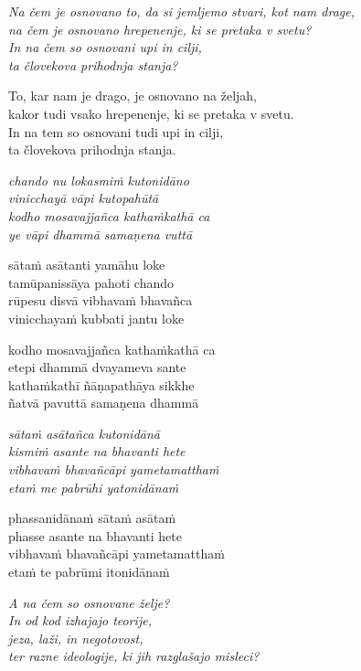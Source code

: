 \emph{Na čem je osnovano to, da si jemljemo stvari, kot nam drage,}\\
\emph{na čem je osnovano hrepenenje, ki se pretaka v svetu?}\\
\emph{In na čem so osnovani upi in cilji,}\\
\emph{ta človekova prihodnja stanja?}

To, kar nam je drago, je osnovano na željah,\\
kakor tudi vsako hrepenenje, ki se pretaka v svetu.\\
In na tem so osnovani tudi upi in cilji,\\
ta človekova prihodnja stanja.


\clearpage

\emph{chando nu lokasmiṁ kutonidāno\\
vinicchayā vāpi kutopahūtā}\\
\emph{kodho mosavajjañca kathaṁkathā ca\\
ye vāpi dhammā samaṇena vuttā}

sātaṁ asātanti yamāhu loke\\
tamūpanissāya pahoti chando\\
rūpesu disvā vibhavaṁ bhavañca\\
vinicchayaṁ kubbati jantu loke

kodho mosavajjañca kathaṁkathā ca\\
etepi dhammā dvayameva sante\\
kathaṁkathī ñāṇapathāya sikkhe\\
ñatvā pavuttā samaṇena dhammā

\emph{sātaṁ asātañca kutonidānā\\
kismiṁ asante na bhavanti hete}\\
\emph{vibhavaṁ bhavañcāpi yametamatthaṁ\\
etaṁ me pabrūhi yatonidānaṁ}

phassanidānaṁ sātaṁ asātaṁ\\
phasse asante na bhavanti hete\\
vibhavaṁ bhavañcāpi yametamatthaṁ\\
etaṁ te pabrūmi itonidānaṁ


\clearpage

\emph{A na čem so osnovane želje?}\\
\emph{In od kod izhajajo teorije,}\\
\emph{jeza, laži, in negotovost,}\\
\emph{ter razne ideologije, ki jih razglašajo misleci?}

